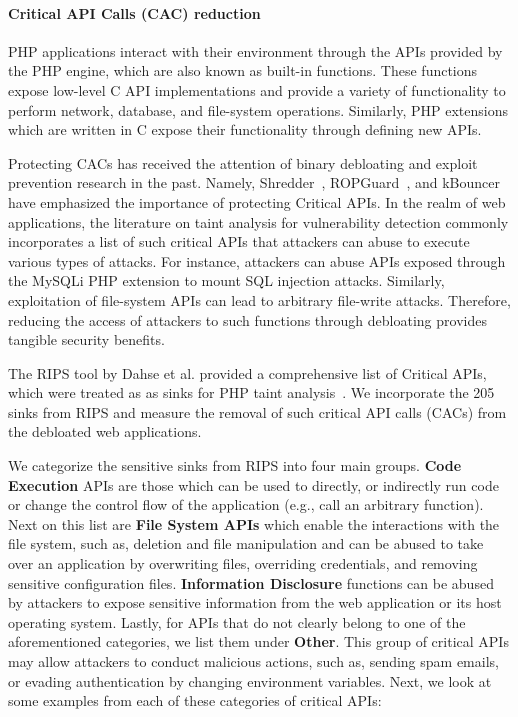 \paragraph{Critical API Calls (CAC) reduction} 
PHP applications interact with their environment through the APIs provided by the PHP engine, which are also known as built-in functions. 
These functions expose low-level C API implementations and provide a variety of functionality to perform network, database, and file-system operations. 
Similarly, PHP extensions which are written in C expose their functionality through defining new APIs. 

Protecting CACs has received the attention of binary debloating and exploit prevention research in the past. 
Namely, Shredder~\cite{mishra2018shredder}, ROPGuard~\cite{fratric2012ropguard}, and kBouncer~\cite{pappas2012kbouncer} have emphasized the importance of protecting Critical APIs. 
In the realm of web applications, the literature on taint analysis for vulnerability detection commonly incorporates a list of such critical APIs that attackers can abuse to execute various types of attacks. 
For instance, attackers can abuse APIs exposed through the MySQLi PHP extension to mount SQL injection attacks. 
Similarly, exploitation of file-system APIs can lead to arbitrary file-write attacks. 
Therefore, reducing the access of attackers to such functions through debloating provides tangible security benefits.

The RIPS tool by Dahse et al. provided a comprehensive list of Critical APIs, which were treated as as sinks for PHP taint analysis~\cite{dahse2010rips}. 
We incorporate the 205 sinks from RIPS and measure the removal of such critical API calls (CACs) from the debloated web applications. 

We categorize the sensitive sinks from RIPS into four main groups. \textbf{Code Execution} APIs are those which can be used to directly, or indirectly run code or change the control flow of the application (e.g., call an arbitrary function). 
Next on this list are \textbf{File System APIs} which enable the interactions with the file system, such as, deletion and file manipulation and can be abused to take over an application by overwriting files, overriding credentials, and removing sensitive configuration files. 
\textbf{Information Disclosure} functions can be abused by attackers to expose sensitive information from the web application or its host operating system. 
Lastly, for APIs that do not clearly belong to one of the aforementioned categories, we list them under \textbf{Other}. 
This group of critical APIs may allow attackers to conduct malicious actions, such as, sending spam emails, or evading authentication by changing environment variables. 
Next, we look at some examples from each of these categories of critical APIs: 

